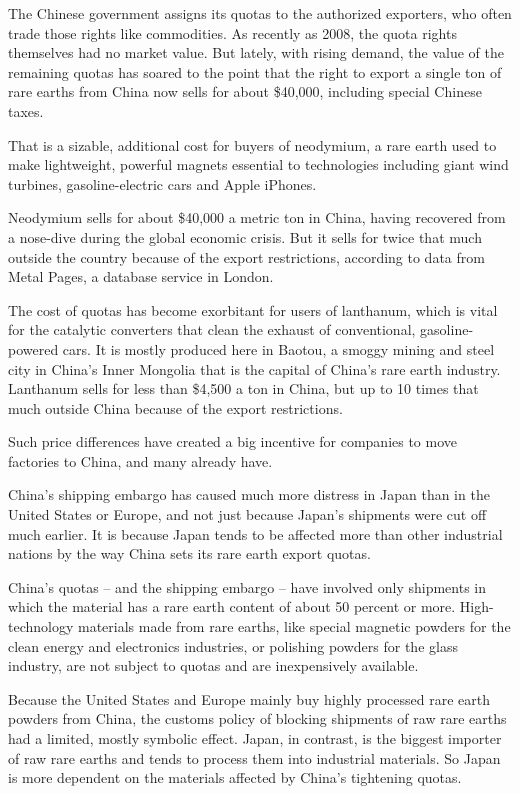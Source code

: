 ﻿\documentclass[12pt]{article}
\begin{document}
The Chinese government assigns its quotas to the authorized exporters, who often trade those rights
like commodities. As recently as 2008, the quota rights themselves had no market value. But lately,
with rising demand, the value of the remaining quotas has soared to the point that the right to
export a single ton of rare earths from China now sells for about \$40,000, including special
Chinese taxes.

That is a sizable, additional cost for buyers of neodymium, a rare earth used to make lightweight,
powerful magnets essential to technologies including giant wind turbines, gasoline-electric cars and
Apple iPhones.

Neodymium sells for about \$40,000 a metric ton in China, having recovered from a nose-dive during
the global economic crisis. But it sells for twice that much outside the country because of the
export restrictions, according to data from Metal Pages, a database service in London.

The cost of quotas has become exorbitant for users of lanthanum, which is vital for the catalytic
converters that clean the exhaust of conventional, gasoline-powered cars. It is mostly produced here
in Baotou, a smoggy mining and steel city in China's Inner Mongolia that is the capital of China's
rare earth industry. Lanthanum sells for less than \$4,500 a ton in China, but up to 10 times that
much outside China because of the export restrictions.

Such price differences have created a big incentive for companies to move factories to China, and
many already have.

China's shipping embargo has caused much more distress in Japan than in the United States or Europe,
and not just because Japan's shipments were cut off much earlier. It is because Japan tends to be
affected more than other industrial nations by the way China sets its rare earth export quotas.

China's quotas -- and the shipping embargo -- have involved only shipments in which the material has
a rare earth content of about 50 percent or more. High-technology materials made from rare earths,
like special magnetic powders for the clean energy and electronics industries, or polishing powders
for the glass industry, are not subject to quotas and are inexpensively available.

Because the United States and Europe mainly buy highly processed rare earth powders from China, the
customs policy of blocking shipments of raw rare earths had a limited, mostly symbolic effect.
Japan, in contrast, is the biggest importer of raw rare earths and tends to process them into
industrial materials. So Japan is more dependent on the materials affected by China's tightening
quotas.
\end{document}
